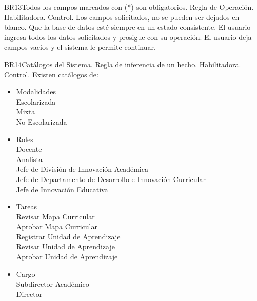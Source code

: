 \begin{BussinesRule}{BR13}{Todos los campos marcados con (*) son obligatorios.}
    \BRitem[Tipo:] Regla de Operación.
    \BRitem[Clase:] Habilitadora.
    \BRitem[Nivel:] Control.
    \BRitem[Descripción:] Los campos solicitados, no se pueden ser dejados en blanco.
    \BRitem[Sentencia:]
    \BRitem[Motivación: ]Que la base de datos esté siempre en un estado consistente.
     El usuario ingresa todos los datos solicitados y prosigue con su operación.
    El usuario deja campos vacios y el sistema le permite continuar.
\end{BussinesRule}
\begin{BussinesRule}{BR14}{Catálogos del Sistema.}
    \BRitem[Tipo: ]Regla de inferencia de un hecho.
    \BRitem[Clase: ]Habilitadora.
    \BRitem[Nivel: ]Control.
    \BRitem[Descripción: ]Existen catálogos de:
    \begin{itemize}
        \item Modalidades\\
            Escolarizada\\
            Mixta\\
            No Escolarizada
        \item Roles\\
            Docente\\
            Analista\\
            Jefe de División de Innovación Académica\\
            Jefe de Departamento de Desarrollo e Innovación Curricular\\
            Jefe de Innovación Educativa
        \item Tareas\\
            Revisar Mapa Curricular\\
            Aprobar Mapa Curricular\\
            Registrar Unidad de Aprendizaje\\
            Revisar Unidad de Aprendizaje\\
            Aprobar Unidad de Aprendizaje
        \item Cargo\\
            Subdirector Académico\\
            Director\\

\end{itemize}
\end{BussinesRule}

